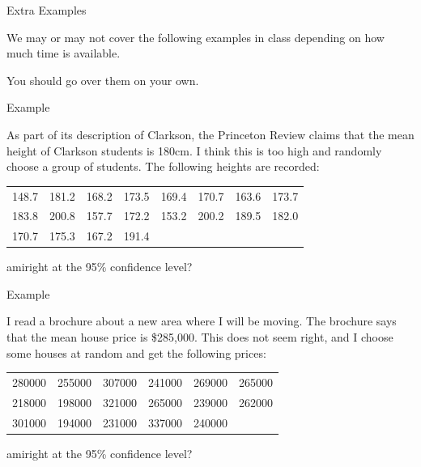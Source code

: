 \begin{frame}{Extra Examples}

  We may or may not cover the following examples in class depending on
  how much time is available.

  \vfill

  You should go over them on your own.

  \vfill
  
\end{frame}

\begin{frame}{Example}

As part of its description of Clarkson, the Princeton Review claims
that the mean height of Clarkson students is 180cm. I think this is
too high and randomly choose a group of students. The following
heights are recorded:

\begin{tabular}{rrrrrrrr}
  148.7 & 181.2 & 168.2 & 173.5 & 169.4 & 170.7 & 163.6 & 173.7 \\
  183.8 & 200.8 & 157.7 & 172.2 & 153.2 & 200.2 & 189.5 & 182.0 \\
  170.7 & 175.3 & 167.2 & 191.4
\end{tabular}

amiright at the 95\% confidence level?

\vfill


  
\end{frame}

\begin{frame}{Example}

  I read a brochure about a new area where I will be moving. The
  brochure says that the mean house price is \$285,000. This does not
  seem right, and I choose some houses at random and get the following
  prices:

\begin{tabular}{rrrrrr}
  280000 & 255000 & 307000 & 241000 & 269000 & 265000 \\
  218000 & 198000 & 321000 & 265000 & 239000 & 262000 \\
  301000 & 194000 & 231000 & 337000 & 240000
\end{tabular}

amiright at the 95\% confidence level?

\vfill


  
\end{frame}

